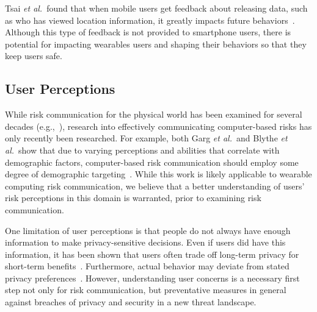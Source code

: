 



Tsai {\it et al.}\ found that when mobile users get feedback about releasing data, such as who has viewed location information, it greatly impacts future behaviors~\cite{Tsai2009}. Although this type of feedback is not provided to smartphone users, there is potential for impacting wearables users and shaping their behaviors so that they keep users safe. 


\subsection{User Perceptions}
While risk communication for the physical world has been examined for several decades (e.g.,~\cite{Fischhoff,Morgan2001}), research into effectively communicating computer-based risks has only recently been researched. For example, both Garg {\it et al.}\ and Blythe {\it et al.}\ show that due to varying perceptions and abilities that correlate with demographic factors, computer-based risk communication should employ some degree of demographic targeting~\cite{Garg2012,Blythe2011}. While this work is likely applicable to wearable computing risk communication, we believe that a better understanding of users' risk perceptions in this domain is warranted, prior to examining risk communication.

One limitation of user perceptions is that people do not always have enough information to make privacy-sensitive decisions. Even if users did have this information, it has been shown that users often trade off long-term privacy for short-term benefits~\cite{acquisti2005privacy}. Furthermore, actual behavior may deviate from stated privacy preferences~\cite{spiekermann2001privacy}. However, understanding user concerns is a necessary first step not only for risk communication, but preventative measures in general against breaches of privacy and security in a new threat landscape. 